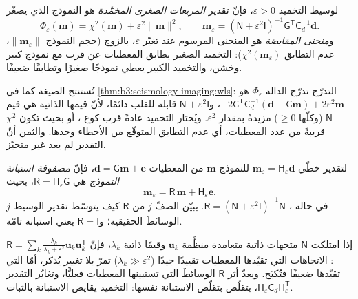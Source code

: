 \begin{definition}\label{def:b3:seismology-imaging:damped}
لوسيط التخميد $\varepsilon > 0$، فإنّ تقدير \emph{المربعات الصغرى
المخمَّدة} هو النموذج الذي يصغّر
\[
  \Phi_\varepsilon(\mathbf m) = \chi^2(\mathbf m) + \varepsilon^2\|\mathbf m\|^2 ,
  \qquad
  \mathbf m_\varepsilon = \left(\mathsf N + \varepsilon^2\mathsf I\right)^{-1}
  \mathsf G^{\mathsf T}\mathsf C_d^{-1}\mathbf d .
\]
و\emph{منحنى المقايضة} هو المنحنى المرسوم عند تغيّر
$\varepsilon$، بالزوج (حجم النموذج $\|\mathbf m_\varepsilon\|$،
عدم التطابق $\chi^2(\mathbf m_\varepsilon)$): التخميد الصغير يطابق المعطيات عن قرب
مع نموذج كبير وخشن، والتخميد الكبير يعطي نموذجًا صغيرًا وتطابقًا ضعيفًا.
\end{definition}

تُستنتج الصيغة كما في \cref{thm:b3:seismology-imaging:wls}: التدرّج
تدرّج الدالة $\Phi_\varepsilon$ هو $-2\mathsf G^{\mathsf T}\mathsf C_d^{-1}(\mathbf d -
\mathsf G\mathbf m) + 2\varepsilon^2\mathbf m$، و$\mathsf N + \varepsilon^2
\mathsf I$ قابلة للقلب دائمًا، لأنّ قيمها الذاتية هي قيم
$\mathsf N$ (وكلّها $\ge 0$) مزيدةً بمقدار $\varepsilon^2$. ويُختار التخميد عادةً
قرب كوع ، أو بحيث تكون $\chi^2$ قريبةً من
عدد المعطيات، أي عدم التطابق المتوقّع من الأخطاء وحدها. والثمن أنّ
التقدير لم يعد غير متحيّز.

\begin{definition}\label{def:b3:seismology-imaging:resolution}
لتقدير خطّي $\mathbf m_\varepsilon = \mathsf H_\varepsilon \mathbf d$
للنموذج $\mathbf m$ من المعطيات $\mathbf d = \mathsf G\mathbf m + \mathbf e$،
فإنّ \emph{مصفوفة استبانة النموذج} هي
$\mathsf R = \mathsf H_\varepsilon\mathsf G$، بحيث
\[
  \mathbf m_\varepsilon = \mathsf R\,\mathbf m + \mathsf H_\varepsilon\mathbf e .
\]
في حالة ، $\mathsf R = (\mathsf N + \varepsilon^2\mathsf I)^{-1}
\mathsf N$. يبيّن الصفّ $j$ من $\mathsf R$ كيف يتوسّط تقدير الوسيط $j$
الوسائطَ الحقيقية؛ و$\mathsf R = \mathsf I$ يعني استبانة تامّة.
\end{definition}

إذا امتلكت $\mathsf N$ متجهات ذاتية متعامدة منظَّمة $\mathbf u_k$ وقيمًا ذاتية
$\lambda_k$، فإنّ $\mathsf R = \sum_k \frac{\lambda_k}{\lambda_k + \varepsilon^2}
\mathbf u_k\mathbf u_k^{\mathsf T}$: الاتجاهات التي تقيّدها المعطيات تقييدًا جيدًا
($\lambda_k \gg \varepsilon^2$) تمرّ بلا تغيير يُذكر، أمّا التي تقيّدها ضعيفًا فتُكبَح. ويعدّ
أثر $\mathsf R$ الوسائطَ التي تستبينها المعطيات
فعليًّا، وتغايُر التقدير
$\mathsf H_\varepsilon\mathsf C_d\mathsf H_\varepsilon^{\mathsf T}$، يتقلّص
بتقلّص الاستبانة نفسها: التخميد يقايض الاستبانة بالثبات.

